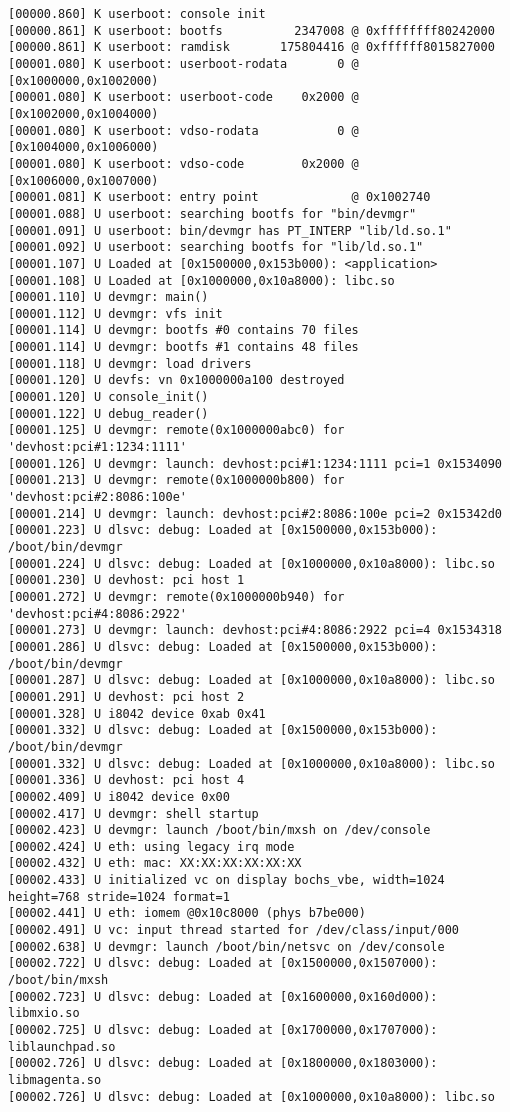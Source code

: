 \documentclass[14pt,a4paper]{article}
\begin{document}
\begin{lstlisting}
[00000.860] K userboot: console init
[00000.861] K userboot: bootfs          2347008 @ 0xffffffff80242000
[00000.861] K userboot: ramdisk       175804416 @ 0xffffff8015827000
[00001.080] K userboot: userboot-rodata       0 @ [0x1000000,0x1002000)
[00001.080] K userboot: userboot-code    0x2000 @ [0x1002000,0x1004000)
[00001.080] K userboot: vdso-rodata           0 @ [0x1004000,0x1006000)
[00001.080] K userboot: vdso-code        0x2000 @ [0x1006000,0x1007000)
[00001.081] K userboot: entry point             @ 0x1002740
[00001.088] U userboot: searching bootfs for "bin/devmgr"
[00001.091] U userboot: bin/devmgr has PT_INTERP "lib/ld.so.1"
[00001.092] U userboot: searching bootfs for "lib/ld.so.1"
[00001.107] U Loaded at [0x1500000,0x153b000): <application>
[00001.108] U Loaded at [0x1000000,0x10a8000): libc.so
[00001.110] U devmgr: main()
[00001.112] U devmgr: vfs init
[00001.114] U devmgr: bootfs #0 contains 70 files
[00001.114] U devmgr: bootfs #1 contains 48 files
[00001.118] U devmgr: load drivers
[00001.120] U devfs: vn 0x1000000a100 destroyed
[00001.120] U console_init()
[00001.122] U debug_reader()
[00001.125] U devmgr: remote(0x1000000abc0) for 'devhost:pci#1:1234:1111'
[00001.126] U devmgr: launch: devhost:pci#1:1234:1111 pci=1 0x1534090
[00001.213] U devmgr: remote(0x1000000b800) for 'devhost:pci#2:8086:100e'
[00001.214] U devmgr: launch: devhost:pci#2:8086:100e pci=2 0x15342d0
[00001.223] U dlsvc: debug: Loaded at [0x1500000,0x153b000): /boot/bin/devmgr
[00001.224] U dlsvc: debug: Loaded at [0x1000000,0x10a8000): libc.so
[00001.230] U devhost: pci host 1
[00001.272] U devmgr: remote(0x1000000b940) for 'devhost:pci#4:8086:2922'
[00001.273] U devmgr: launch: devhost:pci#4:8086:2922 pci=4 0x1534318
[00001.286] U dlsvc: debug: Loaded at [0x1500000,0x153b000): /boot/bin/devmgr
[00001.287] U dlsvc: debug: Loaded at [0x1000000,0x10a8000): libc.so
[00001.291] U devhost: pci host 2
[00001.328] U i8042 device 0xab 0x41
[00001.332] U dlsvc: debug: Loaded at [0x1500000,0x153b000): /boot/bin/devmgr
[00001.332] U dlsvc: debug: Loaded at [0x1000000,0x10a8000): libc.so
[00001.336] U devhost: pci host 4
[00002.409] U i8042 device 0x00
[00002.417] U devmgr: shell startup
[00002.423] U devmgr: launch /boot/bin/mxsh on /dev/console
[00002.424] U eth: using legacy irq mode
[00002.432] U eth: mac: XX:XX:XX:XX:XX:XX
[00002.433] U initialized vc on display bochs_vbe, width=1024 height=768 stride=1024 format=1
[00002.441] U eth: iomem @0x10c8000 (phys b7be000)
[00002.491] U vc: input thread started for /dev/class/input/000
[00002.638] U devmgr: launch /boot/bin/netsvc on /dev/console
[00002.722] U dlsvc: debug: Loaded at [0x1500000,0x1507000): /boot/bin/mxsh
[00002.723] U dlsvc: debug: Loaded at [0x1600000,0x160d000): libmxio.so
[00002.725] U dlsvc: debug: Loaded at [0x1700000,0x1707000): liblaunchpad.so
[00002.726] U dlsvc: debug: Loaded at [0x1800000,0x1803000): libmagenta.so
[00002.726] U dlsvc: debug: Loaded at [0x1000000,0x10a8000): libc.so
\end{lstlisting}
\end{document}
